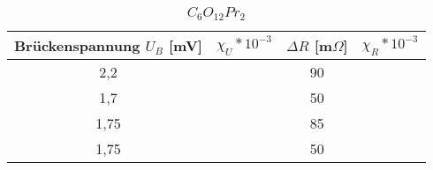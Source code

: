 \begin{table}[ht]
	\begin{center}
		\begin{tabular}{cc|cc}
			Brückenspannung $U_B$ [mV]&$\chi_{U}*10^{-3}$ & $\Delta R$ [m$\Omega$]&$\chi_R*10^{-3}$\\ \hline
			2,2&	&90&\\
			1,7&	&50&\\
			1,75&&85&\\
			1,75&&50&\\
		\end{tabular}
		\caption{$C_6O_{12}Pr_2$}
		\label{tab1}
	\end{center}
\end{table}